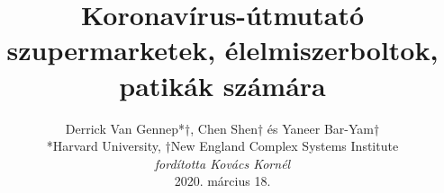 \documentclass[onecolumn,journal]{IEEEtran}
\begin{document}
\title{\color{Brown} Koronavírus-útmutató
szupermarketek, élelmiszerboltok, patikák számára
 \\
\vspace{-0.35ex}}
\author{Derrick Van Gennep*†, Chen Shen† és Yaneer Bar-Yam† \\ *Harvard University, †New England Complex Systems Institute \\
\vspace{+0.35ex}
\small{\textit{fordította Kovács Kornél}}\\
 2020. március 18.
  \vspace{-14ex} \\


\bigskip
\bigskip

\textbf{}
 }

\maketitle


\flushbottom %



\thispagestyle{empty} %




\renewcommand{\thefootnote}{\fnsymbol{footnote}}
\end{document}
